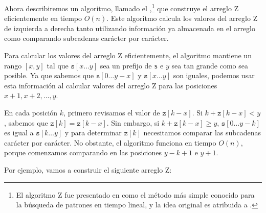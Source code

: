 Ahora describiremos un algoritmo, llamado el ,\footnote{
    El algoritmo Z fue presentado en \cite{gus97} como el método más
    simple conocido para la búsqueda de patrones en tiempo lineal, y la
    idea original es atribuida a \cite{mai84}.
} que construye el arreglo Z eficientemente en tiempo $O(n)$. Este
algoritmo calcula los valores del arreglo Z de izquierda a derecha
tanto utilizando información ya almacenada en el arreglo como
comparando subcadenas carácter por carácter.

Para calcular los valores del arreglo Z eficientemente, el algoritmo
mantiene un rango $[x,y]$ tal que $\texttt{s}[x \ldots y]$ sea un
prefijo de \texttt{s} e $y$ sea tan grande como sea posible. Ya que
sabemos que $\texttt{s}[0 \ldots y-x]$ y $\texttt{s}[x \ldots y]$ son
iguales, podemos usar esta información al calcular valores del arreglo
Z para las posiciones $x+1,x+2,\ldots,y$.

En cada posición $k$, primero revisamos el valor de $\texttt{z}[k-x]$.
Si $k+\texttt{z}[k-x]<y$, sabemos que $\texttt{z}[k]=\texttt{z}[k-x]$.
Sin embargo, si $k+\texttt{z}[k-x] \ge y$, $\texttt{s}[0 \ldots y-k]$
es igual a $\texttt{s}[k \ldots y]$ y para determinar $\texttt{z}[k]$
necesitamos comparar las subcadenas carácter por carácter. No obstante,
el algoritmo funciona en tiempo $O(n)$, porque comenzamos comparando en
las posiciones $y-k+1$ e $y+1$.

Por ejemplo, vamos a construir el siguiente arreglo Z:

